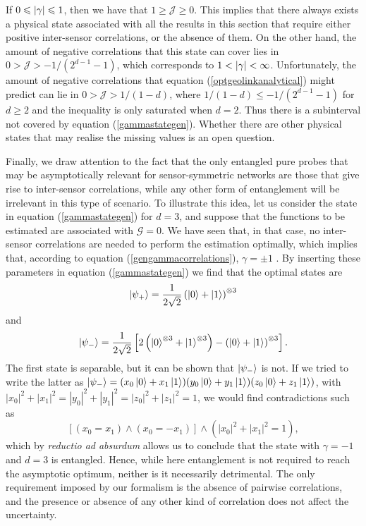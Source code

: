 If $0 \leqslant \abs{\gamma} \leqslant 1$, then we have that $1 \geqslant \mathcal{J} \geqslant 0$. This implies that there always exists a physical state associated with all the results in this section that require either positive inter-sensor correlations, or the absence of them. On the other hand, the amount of negative correlations that this state can cover lies in $ 0 > \mathcal{J} > - 1/(2^{d-1}-1)$, which corresponds to $1 < \abs{\gamma} < \infty$. Unfortunately, the amount of negative correlations that equation (\ref{optgeolinkanalytical}) might predict can lie in $ 0 > \mathcal{J} > 1/(1-d)$, where $1/(1-d) \leqslant - 1/(2^{d-1}-1)$ for $d\geqslant 2$ and the inequality is only saturated when $d=2$. Thus there is a subinterval not covered by equation (\ref{gammastategen}). Whether there are other physical states that may realise the missing values is an open question. 

Finally, we draw attention to the fact that the only entangled pure probes that may be asymptotically relevant for sensor-symmetric networks are those that give rise to inter-sensor correlations, while any other form of entanglement will be irrelevant in this type of scenario. To illustrate this idea, let us consider the state in equation (\ref{gammastategen}) for $d = 3$, and suppose that the functions to be estimated are associated with $\mathcal{G} = 0$. We have seen that, in that case, no inter-sensor correlations are needed to perform the estimation optimally, which implies that, according to equation (\ref{gengammacorrelations}), $\gamma = \pm 1$ . By inserting these parameters in equation (\ref{gammastategen}) we find that the optimal states are
\begin{equation}
\ket{\psi_{+}} = \frac{1}{2\sqrt{2}}\left(\ket{0}+\ket{1}\right)^{\otimes 3}
\end{equation}
and
\begin{equation}
\ket{\psi_{-}} = \frac{1}{2\sqrt{2}} \left[2\left(\ket{0}^{\otimes 3} + \ket{1}^{\otimes 3}\right) - \left(\ket{0} + \ket{1} \right)^{\otimes 3} \right].
\end{equation}
The first state is separable, but it can be shown that $\ket{\psi_{-}}$ is not. If we tried to write the latter as
$\ket{\psi_{-}} = (x_0\ket{0}+x_1\ket{1})(y_0\ket{0}+y_1\ket{1})(z_0\ket{0}+z_1\ket{1})$, with $|x_0|^2+|x_1|^2 = |y_0|^2+|y_1|^2  = |z_0|^2+|z_1|^2 = 1$, we would find contradictions such as 
\begin{equation}
\left[(x_0 = x_1) \land (x_0 = - x_1)\right]\land (|x_0|^2+|x_1|^2 = 1),
\end{equation}
which by \emph{reductio ad absurdum} allows us to conclude that the state with $\gamma = -1$ and $d = 3$ is entangled. Hence, while here entanglement is not required to reach the asymptotic optimum, neither is it necessarily detrimental. The only requirement imposed by our formalism is the absence of pairwise correlations, and the presence or absence of any other kind of correlation does not affect the uncertainty. 

